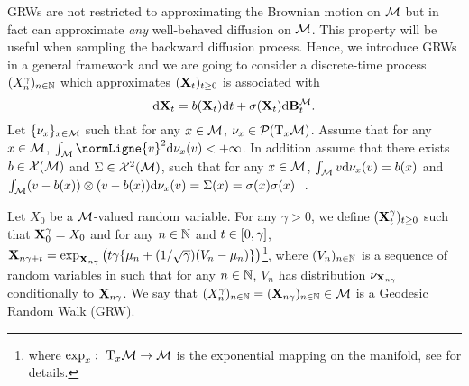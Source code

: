 GRWs are not restricted to approximating the Brownian motion on $\mathcal M$ but in fact
can approximate \emph{any} well-behaved diffusion on $\mathcal M$. This property will be
useful when sampling the backward diffusion process. Hence, we introduce GRWs in
a general framework and we are going to consider a discrete-time process
$(X_n^\gamma)_{n \in \mathbb{N}}$ which approximates $(\mathbf{X}_t)_{t \geq 0}$
is associated with
\begin{equation}
  \label{eq:generic}
 \mathrm{d} \mathbf{X}_t = b(\mathbf{X}_t) \mathrm{d} t + \sigma(\mathbf{X}_t) \mathrm{d} \mathbf{B}_t^\mathcal M.
\end{equation}
Let
$\{ \nu_x \}_{x \in \mathcal M}$ such that for any $x \in \mathcal M$,
$\nu_x \in \mathcal{P}(\mathrm{T}_x \mathcal M)$. Assume that for any $x \in \mathcal M$,
$\int_{\M} \normLigne{v}^2 \rmd \nu_x(v)< +\infty$. In addition assume that
there exists $b \in \mathcal{X}(\mathcal{M})$ and $\Sigma \in \mathcal{X}^2(\mathcal{M})$, such that for any $x \in \mathcal M$,
$\int_{\mathcal M} v \mathrm{d} \nu_x(v) = b(x)$ and
$\int_{\mathcal M} (v - b(x)) \otimes (v - b(x)) \mathrm{d} \nu_x(v) =
\Sigma(x) = \sigma(x) \sigma(x)^\top$. %


\begin{definition}
  Let $X_0$ be a $\mathcal M$-valued random variable.  For any $\gamma > 0$, we
  define $(\mathbf{X}_t^{\gamma})_{t \geq 0}$ such that $\mathbf{X}_0^\gamma = X_0$ and
  for any $n \in \mathbb{N}$ and $t \in \left[0, \gamma\right]$,
  $\mathbf{X}_{n\gamma + t} = \exp_{\mathbf{X}_{n \gamma}}\left(t\gamma \{ \mu_n +
  (1/\sqrt{\gamma}) (V_n - \mu_n)\}\right)$\footnote{where $\exp_x: \ \mathrm{T}_x \mathcal M \to \mathcal M$ is the exponential mapping on the manifold, see \citet[Chapter 20]{lee2013smooth} for details.}, where $(V_n)_{n \in \mathbb{N}}$ is a
  sequence of random variables in such that for any $n \in \mathbb{N}$, $V_n$ has
  distribution $\nu_{\mathbf{X}_{n \gamma}}$ conditionally to $\mathbf{X}_{n
    \gamma}$. We say that
  $(X_n^\gamma)_{n \in \mathbb{N}} = (\mathbf{X}_{n \gamma})_{n \in \mathbb{N}} \in 
  \mathcal M$ is a Geodesic
  Random Walk (GRW).
\end{definition}

